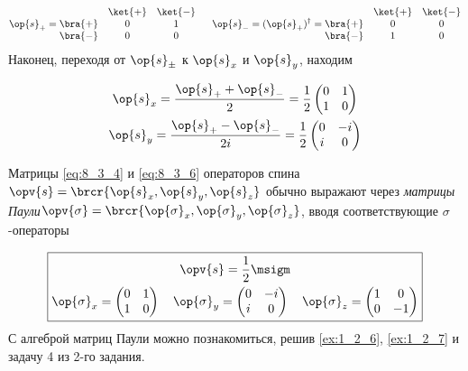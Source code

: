 \begin{equation}
\label{eq:8_3_5}
\op{s}_{+} = 
\begin{matrix}
            & \ket{+} & \ket{-} \\
\bra{+} &  0         & 1         \\
\bra{-}  &  0         & 0         
\end{matrix}
~~~~~\op{s}_{-} = (\op{s}_{+})^\dag = 
\begin{matrix}
            & \ket{+} & \ket{-} \\
\bra{+} &  0         & 0         \\
\bra{-}  &  1         & 0         
\end{matrix}
\end{equation}%
%
Наконец, переходя от $\op{s}_{\pm}$ к $\op{s}_x$ и $\op{s}_y$, находим

\begin{equation}
\label{eq:8_3_6}
\begin{gathered}
\op{s}_x = \frac{\op{s}_{+} + \op{s}_{-}}{2} = \frac{1}{2} \left (
  \begin{matrix}
  0 & 1 \\
  1 & 0 
  \end{matrix}
\right )
\\
\op{s}_y = \frac{\op{s}_{+} - \op{s}_{-}}{2i} = \frac{1}{2} \left (
  \begin{matrix}
  0 & -i \\
  i & 0 
  \end{matrix}
\right )
\end{gathered}
\end{equation}

Матрицы \eqref{eq:8_3_4} и \eqref{eq:8_3_6} операторов спина $\opv{s} = \brcr{\op{s}_x, \op{s}_y, \op{s}_z}$ обычно выражают через {\em матрицы Паули}\footnotemark $\opv{\sigma} = \brcr{\op{\sigma}_x, \op{\sigma}_y, \op{\sigma}_z}$, вводя соответствующие $\sigma$-операторы

$$
\boxed{
\begin{gathered}
  \opv{s}= \frac{1}{2}\msigm\\
  \op{\sigma}_x = \left (
    \begin{matrix}
    0 & 1 \\
    1 & 0 
    \end{matrix}
  \right )
  ~~~
  \op{\sigma}_y = \left (
    \begin{matrix}
    0 & -i \\
    i & 0 
    \end{matrix}
  \right )
  ~~~
  \op{\sigma}_z = \left (
    \begin{matrix}
    1 & 0 \\
    0 & -1 
    \end{matrix}
  \right)
\end{gathered}
}
$$%
%
С алгеброй матриц Паули можно познакомиться, решив \cref{ex:1_2_6}, \cref{ex:1_2_7} и задачу 4 из 2-го задания.

